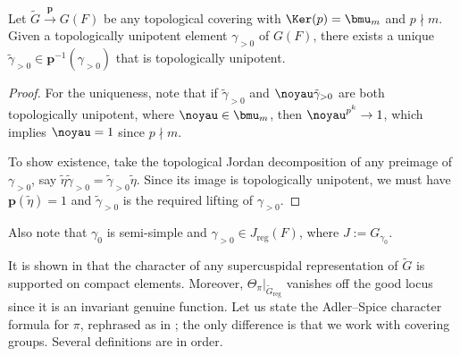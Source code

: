 \documentclass[a4paper,10pt]{article}
\begin{document}
\begin{lemma}
	Let $\tilde{G} \xrightarrow{\bm{p}} G(F)$ be any topological covering with $\Ker(p) = \bmu_m$ and $p \nmid m$. Given a topologically unipotent element $\gamma_{>0}$ of $G(F)$, there exists a unique $\tilde{\gamma}_{>0} \in \bm{p}^{-1}(\gamma_{>0})$ that is topologically unipotent.
\end{lemma}
\begin{proof}
	For the uniqueness, note that if $\tilde{\gamma}_{>0}$ and $\noyau\tilde{\gamma}_{>0}$ are both topologically unipotent, where $\noyau \in \bmu_m$, then $\noyau^{p^k} \to 1$, which implies $\noyau=1$ since $p \nmid m$.
	
	To show existence, take the topological Jordan decomposition of any preimage of $\gamma_{>0}$, say $\tilde{\eta} \tilde{\gamma}_{>0} = \tilde{\gamma}_{>0} \tilde{\eta}$. Since its image is topologically unipotent, we must have $\bm{p}(\tilde{\eta})=1$ and $\tilde{\gamma}_{>0}$ is the required lifting of $\gamma_{>0}$.
\end{proof}
Also note that $\gamma_0$ is semi-simple and $\gamma_{>0} \in J_{\text{reg}}(F)$, where $J := G_{\gamma_0}$.

It is shown in \cite{D76} that the character of any supercuspidal representation of $\tilde{G}$ is supported on compact elements. Moreover, $\Theta_\pi|_{\tilde{G}_{\text{reg}}}$ vanishes off the good locus since it is an invariant genuine function. Let us state the Adler--Spice character formula \cite[Theorem 7.1]{AS09} for $\pi$, rephrased as in \cite[(6.1)]{Kal15}; the only difference is that we work with covering groups. Several definitions are in order.
\end{document}
